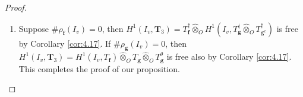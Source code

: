 \documentclass[10pt,a4paper]{amsart}
\newcommand{\GL}[1]{\operatorname{GL}_{#1}}
\newcommand{\R}{\mathcal{R}}
\newcommand{\T}{\mathbf{T}}
\newcommand{\bs}{\boldsymbol}
\newcommand{\f}{\mathbf{f}}
\newcommand{\g}{\mathbf{g}}
\begin{document}
\begin{proof}
\begin{enumerate}
			$\GL{8}(\R)\ (\bs{\rho}_3(t) - 1)\ \GL{8}(\R)$ is given by the matrix 
			\[
			\begin{pmatrix}
				0 & 1 & 0&&&&&
				\\
				&  0& 0&1&&&&
				\\
				& & 0&0&1&&&
				\\
				& & &0&0&1&&
				\\
				&  & &&0&0&1&
				\\
				&&&&&0&0&1
				\\
				&& &&&&0&0
				\\
				&  & &&&&&0
			\end{pmatrix}\,. 
			\]
			This gives us $H^1(I_v,\T_3)$ is free, as required. 
			
			\item Suppose $\#\rho_{\f}(I_v) = 0$, then $H^1(I_v, \T_3) = T_\f^{\dagger} \widehat{\otimes}_{O} H^1(I_v, T_{\g}^{\dagger}\widehat{\otimes}_{O} T_{\g^{c}}^{\dagger})$ is free by Corollary \ref{cor:4.17}. 
			If $\#\rho_{\g}(I_v) = 0$, then $H^1(I_v, \T_3) = H^1(I_v, T_\f)\widehat{\otimes}_{O} T_{\g}\widehat{\otimes}_{O} T_{\g}^{\theta}$ is free also by Corollary \ref{cor:4.17}. This completes the proof of our proposition. 
		\end{enumerate}
		
	\end{proof}
\end{document}
